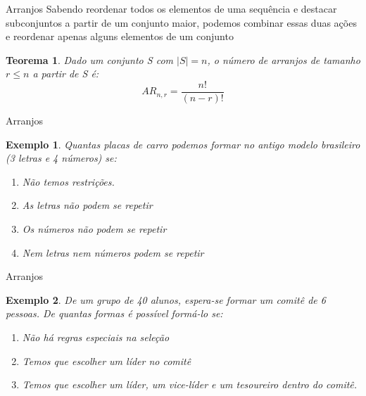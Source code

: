 \documentclass{beamer}
\newtheorem{teorema}{Teorema}
\newtheorem{exemplo}{Exemplo}
\begin{document}
\begin{frame}{Arranjos}
Sabendo reordenar todos os elementos de uma sequência e destacar subconjuntos a partir de um conjunto maior, podemos combinar essas duas ações e reordenar apenas alguns elementos de um conjunto

\begin{teorema}
    Dado um conjunto S com $|S|=n$, o número de arranjos de tamanho $r \leq n$ a partir de S é:
    $$AR_{n,r} = \dfrac{n!}{(n-r)!}$$
\end{teorema}
\end{frame}

\begin{frame}{Arranjos}
    \begin{exemplo}
        Quantas placas de carro podemos formar no antigo modelo brasileiro (3 letras e 4 números) se:

        \begin{enumerate}
            \item Não temos restrições. 
            \item As letras não podem se repetir
            \item Os números não podem se repetir
            \item Nem letras nem números podem se repetir
        \end{enumerate}
    \end{exemplo}
\end{frame}

\begin{frame}{Arranjos}
\begin{exemplo}
    De um grupo de 40 alunos, espera-se formar um comitê de 6 pessoas. De quantas formas é possível formá-lo se:
    \begin{enumerate}
        \item Não há regras especiais na seleção
        \item Temos que escolher um líder no comitê
        \item Temos que escolher um líder, um vice-líder e um tesoureiro dentro do comitê.
    \end{enumerate}
\end{exemplo}
\end{frame}
\end{document}
